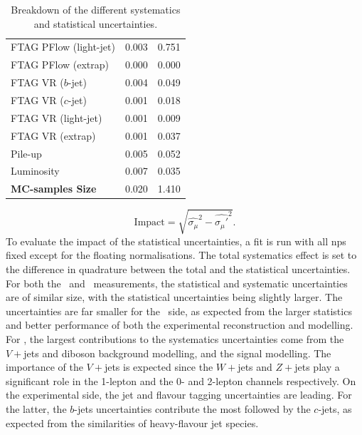 \begin{table}[h!]
\begin{tabular}{l  C{2cm} C{2cm}}
        FTAG PFlow (light-jet)         &  0.003 & 0.751 \\
        FTAG PFlow (extrap)          &  0.000 & 0.000 \\
        FTAG VR ($b$-jet)            &  0.004 & 0.049 \\
        FTAG VR ($c$-jet)            &  0.001 & 0.018 \\
        FTAG VR (light-jet)            &  0.001 & 0.009 \\
        FTAG VR (extrap)             &  0.001 & 0.037 \\
        Pile-up                      &  0.005 & 0.052 \\
        Luminosity                   &  0.007 & 0.035 \\
        \hline
        \textbf{MC-samples Size}     &  0.020 & 1.410 \\
        \hline \hline
    \end{tabular}
    \caption{Breakdown of the different systematics and statistical uncertainties.}
    \label{tab:exp-breakdown}
\end{table}

\begin{equation}
    \text{Impact} = \sqrt{\hat{\sigma_{\mu}}^2 - \hat{\sigma_{\mu}'}^2}.
\end{equation}
To evaluate the impact of the statistical uncertainties, a fit is run with all \glspl{np} fixed except for the floating normalisations. The total systematics effect is set to the difference in quadrature between the total and the statistical uncertainties. For both the \vhb\ and \vhc\ measurements, the statistical and systematic uncertainties are of similar size, with the statistical uncertainties being slightly larger. The uncertainties are far smaller for the \vhb\ side, as expected from the larger statistics and better performance of both the experimental reconstruction and modelling. For \vhb, the largest contributions to the systematics uncertainties come from the $V+$jets and diboson background modelling, and the signal modelling. The importance of the $V+$jets is expected since the $W+$jets and $Z+$jets play a significant role in the 1-lepton and the 0- and 2-lepton channels respectively. On the experimental side, the jet and flavour tagging uncertainties are leading. For the latter, the $b$-jets uncertainties contribute the most followed by the $c$-jets, as expected from the similarities of heavy-flavour jet species. \\

